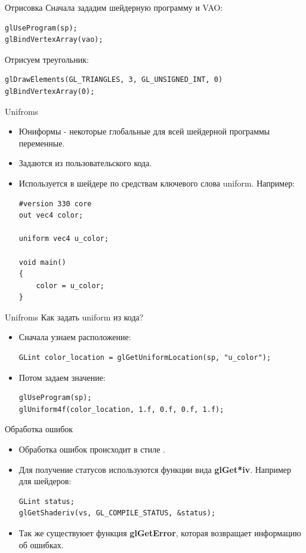 \documentclass[aspectration=1610,t]{beamer}
\begin{document}
\begin{frame}[fragile]{Отрисовка}
    Сначала зададим шейдерную программу и VAO:
    {\small \begin{lstlisting}
glUseProgram(sp); 
glBindVertexArray(vao); 
    \end{lstlisting}}
    Отрисуем треугольник:
    {\small \begin{lstlisting}
glDrawElements(GL_TRIANGLES, 3, GL_UNSIGNED_INT, 0)
glBindVertexArray(0);
    \end{lstlisting}}
\end{frame}

\begin{frame}[fragile]{Unifroms}
    \begin{itemize}
        \item Юниформы - некоторые глобальные для всей шейдерной программы переменные.
        \item Задаются из пользовательского \langcpp кода.
        \item Используется в шейдере по средствам ключевого слова uniform. Например:
            {\small \begin{lstlisting}
#version 330 core
out vec4 color;

uniform vec4 u_color;

void main()
{
    color = u_color;
}
            \end{lstlisting}}
    \end{itemize}
\end{frame}

\begin{frame}[fragile]{Unifroms}
    Как задать uniform из кода?
    \begin{itemize}
        \item Сначала узнаем расположение:
            {\small \begin{lstlisting}
GLint color_location = glGetUniformLocation(sp, "u_color");
            \end{lstlisting}}
        \item Потом задаем значение:
            {\small \begin{lstlisting}
glUseProgram(sp);
glUniform4f(color_location, 1.f, 0.f, 0.f, 1.f);
            \end{lstlisting}}
    \end{itemize}
\end{frame}

\begin{frame}[fragile]{Обработка ошибок}
    \begin{itemize}
        \item Обработка ошибок происходит в стиле \langc.
        \item Для получение статусов используются функции вида {\bf glGet*iv}. 
            Например для шейдеров:
            {\small \begin{lstlisting}
GLint status;
glGetShaderiv(vs, GL_COMPILE_STATUS, &status);
            \end{lstlisting}}
        \item Так же существуюет функция {\bf glGetError}, 
            которая возвращает информацию об ошибках.
    \end{itemize}
\end{frame}
\end{document}
